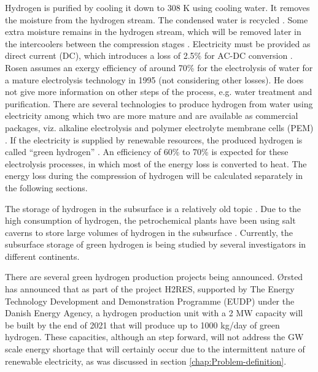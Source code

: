 \documentclass{ECOS_2021}
\begin{document}
Hydrogen is purified by cooling it down to 308 K using cooling water.
It removes the moisture from the hydrogen stream. The condensed water
is recycled \cite{rosenEnergyExergyAnalyses1995}. Some extra moisture
remains in the hydrogen stream, which will be removed later in the
intercoolers between the compression stages \cite{rosenEnergyExergyAnalyses1995}.
Electricity must be provided as direct current (DC), which introduces
a loss of 2.5\% for AC-DC conversion \cite{rosenEnergyExergyAnalyses1995}.
Rosen assumes an exergy efficiency of around 70\% for the electrolysis
of water for a mature electrolysis technology in 1995 (not considering
other losses). He does not give more information on other steps of
the process, e.g. water treatment and purification. There are several
technologies to produce hydrogen from water using electricity among
which two are more mature and are available as commercial packages,
viz. alkaline electrolysis \cite{braunsAlkalineWaterElectrolysis2020}
and polymer electrolyte membrane cells (PEM) \cite{babicCriticalReviewIdentifying2017}.
If the electricity is supplied by renewable resources, the produced
hydrogen is called \textquotedblleft green hydrogen\textquotedblright{}
\cite{granovskiiExergeticLifeCycle2007}. An efficiency of 60\% to
70\% is expected for these electrolysis processes, in which most of
the energy loss is converted to heat. The energy loss during the compression
of hydrogen will be calculated separately in the following sections.

The storage of hydrogen in the subsurface is a relatively old topic
\cite{ozarslanLargescaleHydrogenEnergy2012,zivarUndergroundHydrogenStorage2020}.
Due to the high consumption of hydrogen, the petrochemical plants
have been using salt caverns to store large volumes of hydrogen in
the subsurface \cite{ozarslanLargescaleHydrogenEnergy2012}. Currently,
the subsurface storage of green hydrogen is being studied by several
investigators in different continents.

There are several green hydrogen
production projects being announced. Ørsted has announced that as
part of the project H2RES, supported by The Energy Technology Development
and Demonstration Programme (EUDP) under the Danish Energy Agency,
a hydrogen production unit with a 2 MW capacity will be built by the
end of 2021 \cite{OrstedTakesFinal} that will produce up to 1000
kg/day of green hydrogen. These capacities, although an step forward,
will not address the GW scale energy shortage that will certainly
occur due to the intermittent nature of renewable electricity, as
was discussed in section \ref{chap:Problem-definition}. 
\end{document}
